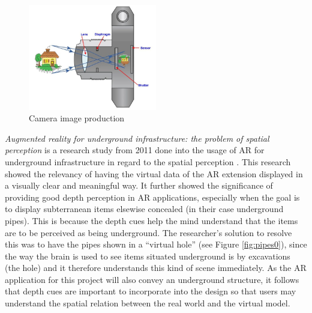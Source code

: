 \begin{figure}[h!]
   \centering
   \includegraphics[width=0.5\textwidth]{figures/camera.jpg}
   \caption{Camera image production \cite{Camera}}\label{fig:camera}
\end{figure}

\textit{Augmented reality for underground infrastructure: the problem of spatial perception} is a research study from 2011 done into the usage of AR for underground infrastructure in regard to the spatial perception \cite{Cote2011}. This research showed the relevancy of having the virtual data of the AR extension displayed in a visually clear and meaningful way. It further showed the significance of providing good depth perception in AR applications, especially when the goal is to display subterranean items elsewise concealed (in their case underground pipes). This is because the depth cues help the mind understand that the items are to be perceived as being underground. The researcher's solution to resolve this was to have the pipes shown in a “virtual hole” (see Figure \ref{fig:pipes0}), since the way the brain is used to see items situated underground is by excavations (the hole) and it therefore understands this kind of scene immediately. As the AR application for this project will also convey an underground structure, it follows that depth cues are important to incorporate into the design so that users may understand the spatial relation between the real world and the virtual model.

